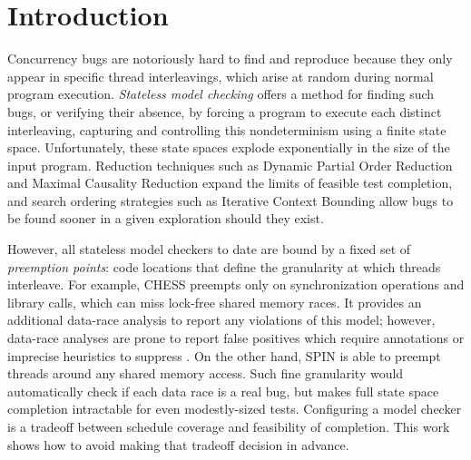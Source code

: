 \section{Introduction}

Concurrency bugs are notoriously hard to find and reproduce because they only appear in specific thread interleavings, which arise at random during normal program execution.
{\em Stateless model checking} \cite{verisoft} offers a method for finding such bugs,
or verifying their absence,
by forcing a program to execute each distinct interleaving,
capturing and controlling this nondeterminism using a finite state space.
Unfortunately, these state spaces explode exponentially in the size of the input program.
Reduction techniques such as Dynamic Partial Order Reduction \cite{dpor} and Maximal Causality Reduction \cite{mcr} expand the limits of feasible test completion,
and search ordering strategies such as Iterative Context Bounding \cite{chess-icb} allow bugs to be found sooner in a given exploration should they exist.

However, all stateless model checkers to date are bound by a fixed set of {\em preemption points}: code locations that define the granularity at which threads interleave.
For example, \textsc{CHESS} \cite{chess} preempts only on synchronization operations and library calls, which can miss lock-free shared memory races.
It provides an additional data-race analysis to report any violations of this model;
however, data-race analyses are prone to report false positives
which require annotations or imprecise heuristics to suppress \cite{racerx,tsan,datacollider}.
%
On the other hand, SPIN \cite{spin}
is able to preempt threads around any shared memory access. Such fine granularity would automatically check if each data race is a real bug, but makes full state space completion intractable for even modestly-sized tests.
%
Configuring a model checker is a tradeoff between schedule coverage and feasibility of completion.
This work shows how to avoid making that tradeoff decision in advance.

